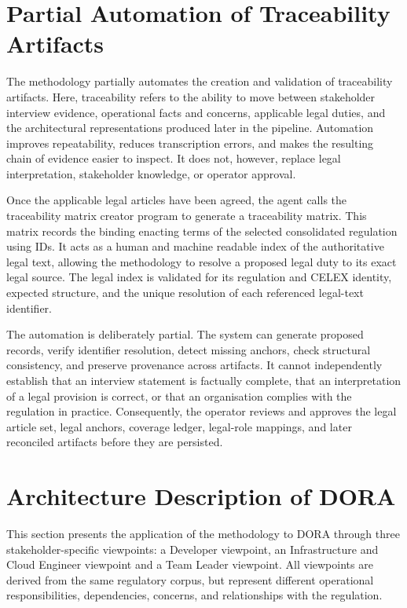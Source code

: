 \section{Partial Automation of Traceability Artifacts}

The methodology partially automates the creation and validation of traceability artifacts. Here, traceability refers to the ability to move between stakeholder interview evidence, operational facts and concerns, applicable legal duties, and the architectural representations produced later in the pipeline. Automation improves repeatability, reduces transcription errors, and makes the resulting chain of evidence easier to inspect. It does not, however, replace legal interpretation, stakeholder knowledge, or operator approval.

Once the applicable legal articles have been agreed, the agent calls the traceability matrix creator program to generate a traceability matrix. This matrix records the binding enacting terms of the selected consolidated regulation using \ac{ID}s. It acts as a human and machine readable index of the authoritative legal text, allowing the methodology to resolve a proposed legal duty to its exact legal source. The legal index is validated for its regulation and CELEX identity, expected structure, and the unique resolution of each referenced legal-text identifier.

The automation is deliberately partial. The system can generate proposed records, verify identifier resolution, detect missing anchors, check structural consistency, and preserve provenance across artifacts. It cannot independently establish that an interview statement is factually complete, that an interpretation of a legal provision is correct, or that an organisation complies with the regulation in practice. Consequently, the operator reviews and approves the legal article set, legal anchors, coverage ledger, legal-role mappings, and later reconciled artifacts before they are persisted.

\section{Architecture Description of DORA}

This section presents the application of the methodology to \ac{DORA} through three stakeholder-specific viewpoints: a Developer viewpoint, an Infrastructure and Cloud Engineer viewpoint and a Team Leader viewpoint. All viewpoints are derived from the same regulatory corpus, but represent different operational responsibilities, dependencies, concerns, and relationships with the regulation.

